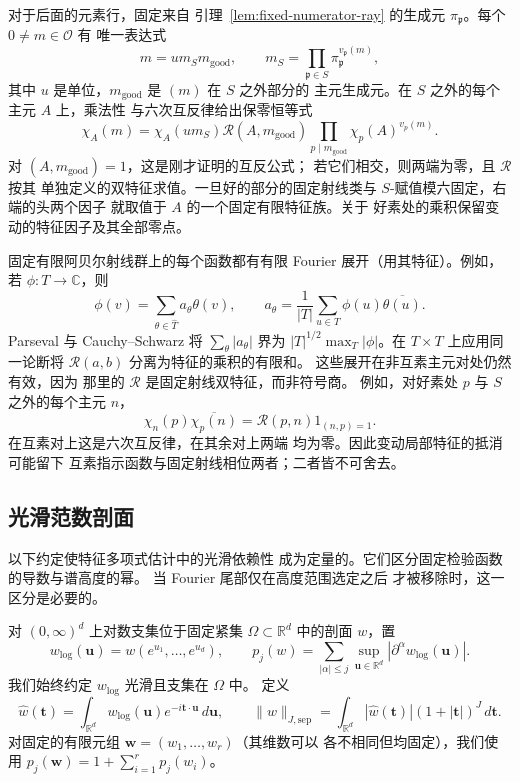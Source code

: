 \documentclass[11pt,a4paper]{article}
\numberwithin{equation}{section}
\numberwithin{figure}{section}
\theoremstyle{definition}
\theoremstyle{remark}
\begin{document}
对于后面的元素行，固定来自
引理~\ref{lem:fixed-numerator-ray} 的生成元 $\pi_{\mathfrak p}$。每个 $0\ne m\in\mathcal O$ 有
唯一表达式
\[
 m=u m_S m_{\mathrm{good}},\qquad
 m_S=\prod_{\mathfrak p\in S}\pi_{\mathfrak p}^{v_{\mathfrak p}(m)},
\]
其中 $u$ 是单位，$m_{\mathrm{good}}$ 是 $(m)$ 在 $S$ 之外部分的
主元生成元。在 $S$ 之外的每个主元 $A$ 上，乘法性
与六次互反律给出保零恒等式
\begin{equation}\label{eq:row-fixed-ray-reduction}
 \chi_A(m)=\chi_A(u m_S)\mathcal R(A,m_{\mathrm{good}})
       \prod_{p\mid m_{\mathrm{good}}}\chi_p(A)^{v_p(m)}.
\end{equation}
对 $(A,m_{\mathrm{good}})=1$，这是刚才证明的互反公式；
若它们相交，则两端为零，且 $\mathcal R$ 按其
单独定义的双特征求值。一旦好的部分的固定射线类与
$S$-赋值模六固定，右端的头两个因子
就取值于 $A$ 的一个固定有限特征族。关于
好素处的乘积保留变动的特征因子及其全部零点。

固定有限阿贝尔射线群上的每个函数都有有限 Fourier
展开（用其特征）。例如，若 $\phi:T\to\mathbb C$，则
\[
 \phi(v)=\sum_{\theta\in\widehat T}a_\theta\theta(v),\qquad
 a_\theta=\frac1{|T|}\sum_{u\in T}\phi(u)\overline{\theta(u)}.
\]
Parseval 与 Cauchy--Schwarz 将 $\sum_\theta|a_\theta|$ 界为
$|T|^{1/2}\max_T|\phi|$。在 $T\times T$ 上应用同一论断将
$\mathcal R(a,b)$ 分离为特征的乘积的有限和。
这些展开在非互素主元对处仍然有效，因为
那里的 $\mathcal R$ 是固定射线双特征，而非符号商。
例如，对好素处 $p$ 与 $S$ 之外的每个主元 $n$，
\[
 \chi_n(p)\overline{\chi_p(n)}
       =\mathcal R(p,n)1_{(n,p)=1}.
\]
在互素对上这是六次互反律，在其余对上两端
均为零。因此变动局部特征的抵消可能留下
互素指示函数与固定射线相位两者；二者皆不可舍去。

\subsection{光滑范数剖面}

以下约定使特征多项式估计中的光滑依赖性
成为定量的。它们区分固定检验函数的导数与谱高度的幂。
当 Fourier 尾部仅在高度范围选定之后
才被移除时，这一区分是必要的。

对 $(0,\infty)^d$ 上对数支集位于固定紧集
$\Omega\subset\mathbb R^d$ 中的剖面 $w$，置
\[
 w_{\log}(\boldsymbol u)=w(e^{u_1},\ldots,e^{u_d}),\qquad
 p_j(w)=\sum_{|\alpha|\le j}\sup_{\boldsymbol u\in\mathbb R^d}
                  |\partial^\alpha w_{\log}(\boldsymbol u)|.
\]
我们始终约定 $w_{\log}$ 光滑且支集在 $\Omega$ 中。
定义
\[
 \widehat w(\boldsymbol t)=\int_{\mathbb R^d}w_{\log}(\boldsymbol u)
                    e^{-i\boldsymbol t\cdot\boldsymbol u}\,d\boldsymbol u,
 \qquad
 \|w\|_{J,\mathrm{sep}}
 =\int_{\mathbb R^d}|\widehat w(\boldsymbol t)|
                    (1+|\boldsymbol t|)^J\,d\boldsymbol t.
\]
对固定的有限元组 $\boldsymbol w=(w_1,\ldots,w_r)$（其维数可以
各不相同但均固定），我们使用
$p_j(\boldsymbol w)=1+\sum_{i=1}^r p_j(w_i)$。
\end{document}
